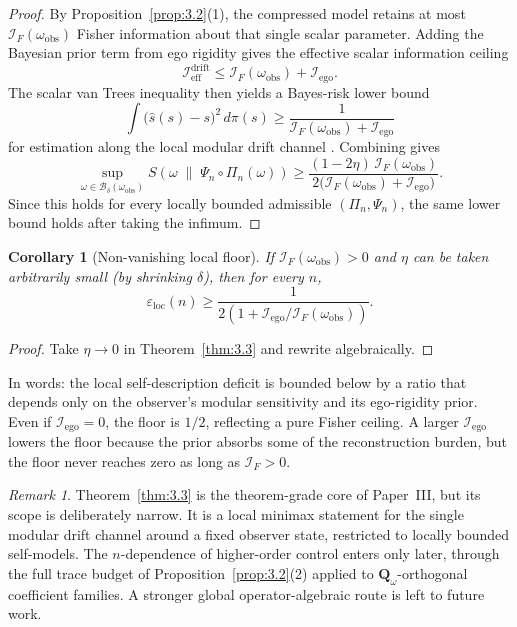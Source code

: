 \documentclass[12pt]{article}
\newtheorem{corollary}[theorem]{Corollary}
\theoremstyle{definition}
\theoremstyle{remark}
\newtheorem{remark}[theorem]{Remark}
\begin{document}
\begin{proof}
By Proposition~\ref{prop:3.2}(1), the compressed model retains at most
\(\mathcal{I}_F(\omega_{\mathrm{obs}})\) Fisher information about that
single scalar parameter. Adding the Bayesian prior term from ego
rigidity gives the effective scalar information ceiling
\[
\mathcal{I}_{\mathrm{eff}}^{\mathrm{drift}}
\le
\mathcal{I}_F(\omega_{\mathrm{obs}})
+
\mathcal{I}_{\mathrm{ego}}.
\]
The scalar van Trees inequality then yields a Bayes-risk lower bound
\[
\int\bigl(\widehat{s}(s)-s\bigr)^2\,d\pi(s)
\ge
\frac{1}{\mathcal{I}_F(\omega_{\mathrm{obs}})
+
\mathcal{I}_{\mathrm{ego}}}
\]
for estimation along the local modular drift channel
\cite{vanTrees1968,TDOMEIII}. Combining gives
\[
\sup_{\omega\in \mathcal{B}_\delta(\omega_{\mathrm{obs}})}
S\!\left(
\omega\;\middle\|\;\Psi_n\circ\Pi_n(\omega)
\right)
\ge
\frac{(1-2\eta)\,\mathcal{I}_F(\omega_{\mathrm{obs}})}
{2\bigl(\mathcal{I}_F(\omega_{\mathrm{obs}})
+
\mathcal{I}_{\mathrm{ego}}\bigr)}.
\]
Since this holds for every locally bounded admissible
\((\Pi_n,\Psi_n)\), the same lower bound holds after taking the
infimum.
\end{proof}

\begin{corollary}[Non-vanishing local floor]\label{cor:3.4}
If \(\mathcal{I}_F(\omega_{\mathrm{obs}})>0\) and \(\eta\) can be
taken arbitrarily small (by shrinking \(\delta\)), then for every
\(n\),
\[
\varepsilon_{\mathrm{loc}}(n)\ge
\frac{1}{
2\left(
1+\mathcal{I}_{\mathrm{ego}}/\mathcal{I}_F(\omega_{\mathrm{obs}})
\right)}.
\]
\end{corollary}

\begin{proof}
Take \(\eta\to 0\) in Theorem~\ref{thm:3.3} and rewrite
algebraically.
\end{proof}

In words: the local self-description deficit is bounded below by a
ratio that depends only on the observer's modular sensitivity and its
ego-rigidity prior. Even if \(\mathcal{I}_{\mathrm{ego}}=0\), the
floor is \(1/2\), reflecting a pure Fisher ceiling. A larger
\(\mathcal{I}_{\mathrm{ego}}\) lowers the floor because the prior
absorbs some of the reconstruction burden, but the floor never reaches
zero as long as \(\mathcal{I}_F>0\).

\begin{remark}\label{rem:3.5}
Theorem~\ref{thm:3.3} is the theorem-grade core of Paper~III, but its
scope is deliberately narrow. It is a local minimax statement for the
single modular drift channel around a fixed observer state, restricted
to locally bounded self-models. The
\(n\)-dependence of higher-order control enters only later, through the
full trace budget of Proposition~\ref{prop:3.2}(2) applied to
\(\mathbf{Q}_\omega\)-orthogonal coefficient families. A stronger global
operator-algebraic route is left to future work.
\end{remark}
\end{document}
